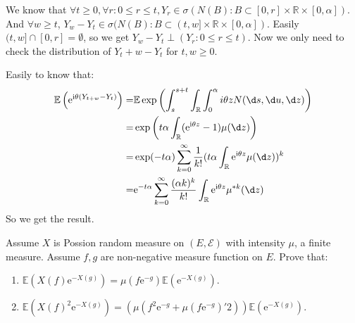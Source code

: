 \documentclass[../main]{subfiles}
\begin{document}
\begin{solution}
  We know that \(\forall t \geq 0,\forall r:0 \leq r \leq t,Y_r \in \sigma(N(B):B \subset [0,r]\times \mathbb{R} \times [0,\alpha])\).
  And \(\forall w \geq t\), \(Y_w-Y_t \in \sigma(N(B):B \subset (t,w] \times \mathbb{R} \times [0,\alpha])\).
  Easily \((t,w] \cap [0,r]=\emptyset\), so we get \(Y_w-Y_t \perp (Y_r:0 \leq r \leq t)\).
  Now we only need to check the distribution of \(Y_t+w - Y_t\) for \(t,w \geq 0\).

  Easily to know that:
  \[
    \begin{aligned}
      \mathbb{E}\left(\mathrm{e}^{\mathrm{i} \theta(Y_{t+w} -Y_t)}\right)= & \mathbb{E}\exp\left(\int_{s}^{s+t} \int_{\mathbb{R}}\int_{0}^\alpha i \theta z N(\d s,\d u,\d z) \right)                             \\
      =                                                                    & \exp\left(t \alpha \int_{\mathbb{R}}(\mathrm{e}^{\mathrm{i} \theta z}-1)\mu(\d z)\right)                                             \\
      =                                                                    & \exp(-t \alpha)\sum_{k=0}^{\infty}  \frac{1}{k!}(t \alpha \int_{\mathbb{R}}\mathrm{e}^{\mathrm{i} \theta z} \mu(\d z))^k             \\
      =                                                                    & \mathrm{e}^{-t \alpha} \sum_{k=0}^{\infty} \frac{(\alpha k)^k}{k!}\int_{\mathbb{R}} \mathrm{e}^{\mathrm{i} \theta z} \mu^{* k}(\d z)
    \end{aligned}
  \]
  So we get the result.
\end{solution}
\begin{problem}\label{pro:5}
  Assume \(X\) is Possion random measure on \((E,\mathcal{E})\) with intensity \(\mu\), a finite measure.
  Assume \(f,g\) are non-negative measure function on \(E\).
  Prove that:
  \begin{enumerate}
    \item \(\mathbb{E}(X(f)\mathrm{e}^{-X(g)})=\mu(f \mathrm{e}^{-g})\mathbb{E}(\mathrm{e}^{-X(g)})\).
    \item \(\mathbb{E}(X(f)^2 \mathrm{e}^{-X(g)})=(\mu(f^2 \mathrm{e}^{-g}+\mu(f \mathrm{e}^{-g})'2))\mathbb{E}(\mathrm{e}^{-X(g)})\).
  \end{enumerate}
\end{problem}
\end{document}
